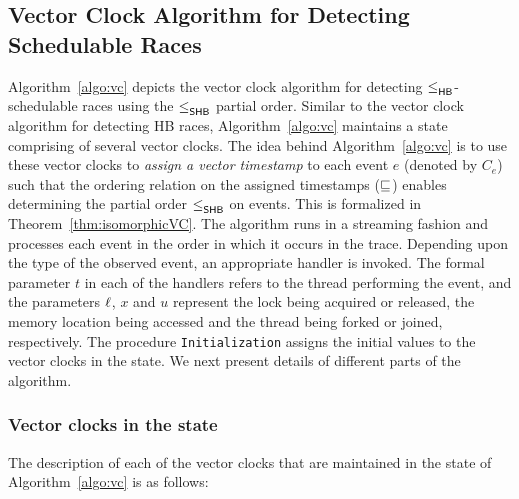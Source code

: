 
\subsection{Vector Clock Algorithm for Detecting Schedulable Races}


Algorithm~\ref{algo:vc} depicts the vector clock algorithm for
detecting $\leq^{}_{\mathsf{HB}}$-schedulable races using the $\leq^{}_{\mathsf{SHB}}$ partial order.
Similar to the vector clock algorithm for detecting HB races,
Algorithm~\ref{algo:vc} maintains a state comprising of several vector
clocks.  The idea behind Algorithm~\ref{algo:vc} is to use these
vector clocks to \emph{assign a vector timestamp} to each event $e$
(denoted by $C_e$) such that the ordering relation on the assigned
timestamps ($\sqsubseteq$) enables determining the partial order $\leq^{}_{\mathsf{SHB}}$ on
events.  This is formalized in Theorem~\ref{thm:isomorphicVC}.  The
algorithm runs in a streaming fashion and processes each event in the
order in which it occurs in the trace.  Depending upon the type of the
observed event, an appropriate handler is invoked.  The formal
parameter $t$ in each of the handlers refers to the thread performing
the event, and the parameters $\ell$, $x$ and $u$ represent the lock
being acquired or released, the memory location being accessed and the
thread being forked or joined, respectively.  The procedure
\texttt{Initialization} assigns the initial values to the vector
clocks in the state.  We next present details of different parts of
the algorithm.



\subsubsection{Vector clocks in the state}
\label{subsec:vc}
The description of each of the vector clocks that are
maintained in the state of Algorithm~\ref{algo:vc} is
as follows:

